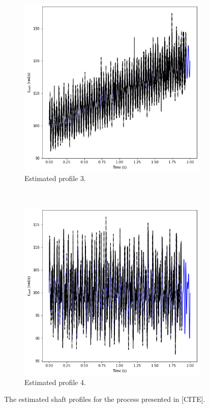 \documentclass{article}
\begin{document}
\begin{figure}[htb!]
		\begin{subfigure}[b]{0.45\textwidth}
			\centering
			\includegraphics[width=\textwidth]{Q4_f3_3.png}
			\caption{Estimated profile 3.}
		\end{subfigure}
		~
		\begin{subfigure}[b]{0.45\textwidth}
			\centering
			\includegraphics[width=\textwidth]{Q4_f4_3.png}
			\caption{Estimated profile 4.}
		\end{subfigure}
		
		\caption{The estimated shaft profiles for the process presented in [CITE].}
		\label{fig:Q4_estimated_profiles_BGC}
	\end{figure}
	
\end{document}
